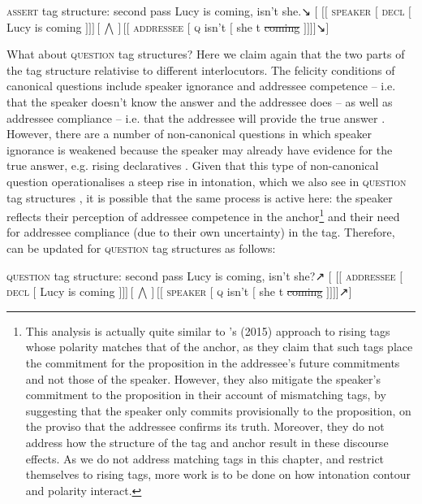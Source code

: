 \documentclass[output=paper,colorlinks,citecolor=brown]{langscibook}
\begin{document}
\ea \textsc{assert} tag structure: second pass\label{asserttag:pass2}
\ea Lucy is coming, isn't she.↘
\ex$[$ $[[$ \textsc{speaker}  $[$ \textsc{decl} $[$ Lucy is coming $]]] [\bigwedge ] [[$ \textsc{addressee} $[$ \textsc{q} isn't $[$ she t \sout{coming} $]]]]$↘$]$\label{asserttag2:b}
    \z\z

What about \textsc{question} tag structures? Here we claim again that the two parts of the tag structure relativise to different interlocutors. The felicity conditions of canonical questions include speaker ignorance and addressee competence – i.e. that the speaker doesn't know the answer and the addressee does – as well as addressee compliance – i.e. that the addressee will provide the true answer \citep{farkas2022}. However, there are a number of non-canonical questions in which speaker ignorance is weakened because the speaker may already have evidence for the true answer, e.g. rising declaratives \citep{gunlogson2001}. Given that this type of non-canonical question operationalises a steep rise in intonation, which we also see in \textsc{question} tag structures \citep[140]{dehebraun2013}, it is possible that the same process is active here: the speaker reflects their perception of addressee competence in the anchor\footnote{This analysis is actually quite similar to \citeauthor{malsteph2015}'s (2015) approach to rising tags whose polarity matches that of the anchor, as they claim that such tags place the commitment for the proposition in the addressee's future commitments and not those of the speaker. However, they also mitigate the speaker's commitment to the proposition in their account of mismatching tags, by suggesting that the speaker only commits provisionally to the proposition, on the proviso that the addressee confirms its truth. Moreover, they do not address how the structure of the tag and anchor result in these discourse effects. As we do not address matching tags in this chapter, and \citet{malsteph2015} restrict themselves to rising tags, more work is to be done on how intonation contour and polarity interact.} and their need for addressee compliance (due to their own uncertainty) in the tag. Therefore,  can be updated for \textsc{question} tag structures as follows:

\ea \textsc{question} tag structure: second pass\label{questiontag:pass2}
\ea Lucy is coming, isn't she?↗
\ex$[$ $[[$ \textsc{addressee}  $[$ \textsc{decl} $[$ Lucy is coming $]]] [\bigwedge ] [[$ \textsc{speaker} $[$ \textsc{q} isn't $[$ she t \sout{coming} $]]]]$↗$]$\label{questiontag2:b}
    \z\z
\end{document}
